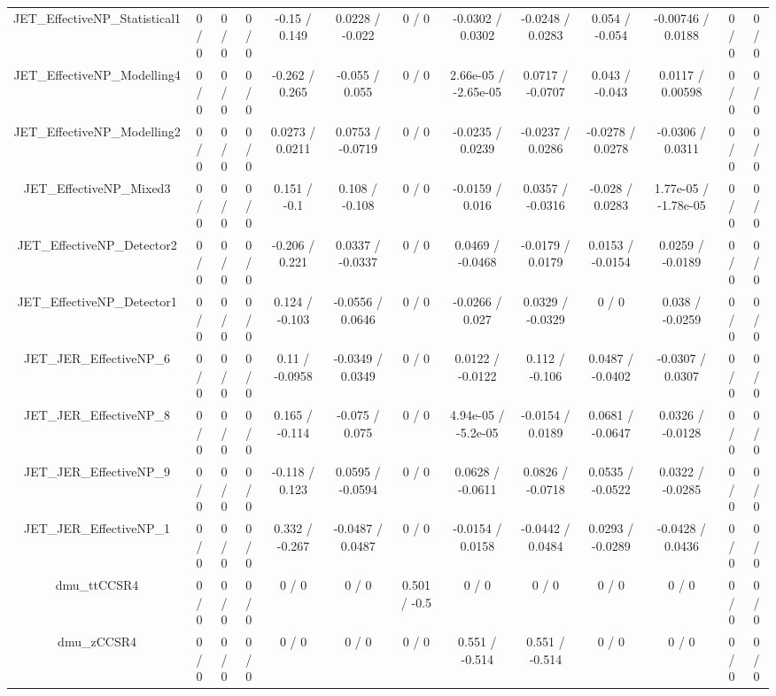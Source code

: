 \documentclass[10pt]{article}
\begin{document}
\begin{table}[htbp]
\begin{center}
\begin{tabular}{|c|c|c|c|c|c|c|c|c|c|c|c|c|}
  JET_EffectiveNP_Statistical1 & 0 / 0 & 0 / 0 & 0 / 0 & -0.15 / 0.149 & 0.0228 / -0.022 & 0 / 0 & -0.0302 / 0.0302 & -0.0248 / 0.0283 & 0.054 / -0.054 & -0.00746 / 0.0188 & 0 / 0 & 0 / 0 \\ 
  JET_EffectiveNP_Modelling4 & 0 / 0 & 0 / 0 & 0 / 0 & -0.262 / 0.265 & -0.055 / 0.055 & 0 / 0 & 2.66e-05 / -2.65e-05 & 0.0717 / -0.0707 & 0.043 / -0.043 & 0.0117 / 0.00598 & 0 / 0 & 0 / 0 \\ 
  JET_EffectiveNP_Modelling2 & 0 / 0 & 0 / 0 & 0 / 0 & 0.0273 / 0.0211 & 0.0753 / -0.0719 & 0 / 0 & -0.0235 / 0.0239 & -0.0237 / 0.0286 & -0.0278 / 0.0278 & -0.0306 / 0.0311 & 0 / 0 & 0 / 0 \\ 
  JET_EffectiveNP_Mixed3 & 0 / 0 & 0 / 0 & 0 / 0 & 0.151 / -0.1 & 0.108 / -0.108 & 0 / 0 & -0.0159 / 0.016 & 0.0357 / -0.0316 & -0.028 / 0.0283 & 1.77e-05 / -1.78e-05 & 0 / 0 & 0 / 0 \\ 
  JET_EffectiveNP_Detector2 & 0 / 0 & 0 / 0 & 0 / 0 & -0.206 / 0.221 & 0.0337 / -0.0337 & 0 / 0 & 0.0469 / -0.0468 & -0.0179 / 0.0179 & 0.0153 / -0.0154 & 0.0259 / -0.0189 & 0 / 0 & 0 / 0 \\ 
  JET_EffectiveNP_Detector1 & 0 / 0 & 0 / 0 & 0 / 0 & 0.124 / -0.103 & -0.0556 / 0.0646 & 0 / 0 & -0.0266 / 0.027 & 0.0329 / -0.0329 & 0 / 0 & 0.038 / -0.0259 & 0 / 0 & 0 / 0 \\ 
  JET_JER_EffectiveNP_6 & 0 / 0 & 0 / 0 & 0 / 0 & 0.11 / -0.0958 & -0.0349 / 0.0349 & 0 / 0 & 0.0122 / -0.0122 & 0.112 / -0.106 & 0.0487 / -0.0402 & -0.0307 / 0.0307 & 0 / 0 & 0 / 0 \\ 
  JET_JER_EffectiveNP_8 & 0 / 0 & 0 / 0 & 0 / 0 & 0.165 / -0.114 & -0.075 / 0.075 & 0 / 0 & 4.94e-05 / -5.2e-05 & -0.0154 / 0.0189 & 0.0681 / -0.0647 & 0.0326 / -0.0128 & 0 / 0 & 0 / 0 \\ 
  JET_JER_EffectiveNP_9 & 0 / 0 & 0 / 0 & 0 / 0 & -0.118 / 0.123 & 0.0595 / -0.0594 & 0 / 0 & 0.0628 / -0.0611 & 0.0826 / -0.0718 & 0.0535 / -0.0522 & 0.0322 / -0.0285 & 0 / 0 & 0 / 0 \\ 
  JET_JER_EffectiveNP_1 & 0 / 0 & 0 / 0 & 0 / 0 & 0.332 / -0.267 & -0.0487 / 0.0487 & 0 / 0 & -0.0154 / 0.0158 & -0.0442 / 0.0484 & 0.0293 / -0.0289 & -0.0428 / 0.0436 & 0 / 0 & 0 / 0 \\ 
  dmu_ttCCSR4 & 0 / 0 & 0 / 0 & 0 / 0 & 0 / 0 & 0 / 0 & 0.501 / -0.5 & 0 / 0 & 0 / 0 & 0 / 0 & 0 / 0 & 0 / 0 & 0 / 0 \\ 
  dmu_zCCSR4 & 0 / 0 & 0 / 0 & 0 / 0 & 0 / 0 & 0 / 0 & 0 / 0 & 0.551 / -0.514 & 0.551 / -0.514 & 0 / 0 & 0 / 0 & 0 / 0 & 0 / 0 \\ 

\end{tabular}
\end{center}
\end{table}
\end{document}
